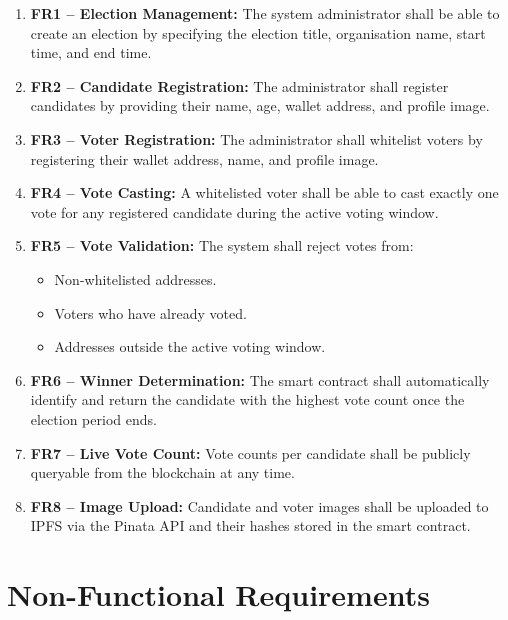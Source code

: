 \documentclass[12pt,a4paper]{report}
\begin{document}
\begin{enumerate}

\item \textbf{FR1 -- Election Management:}
The system administrator shall be able to create an election by specifying
the election title, organisation name, start time, and end time.

\item \textbf{FR2 -- Candidate Registration:}
The administrator shall register candidates by providing their name, age,
wallet address, and profile image.

\item \textbf{FR3 -- Voter Registration:}
The administrator shall whitelist voters by registering their wallet address,
name, and profile image.

\item \textbf{FR4 -- Vote Casting:}
A whitelisted voter shall be able to cast exactly one vote for any registered candidate
during the active voting window.

\item \textbf{FR5 -- Vote Validation:}
The system shall reject votes from:
\begin{itemize}
  \item Non-whitelisted addresses.
  \item Voters who have already voted.
  \item Addresses outside the active voting window.
\end{itemize}

\item \textbf{FR6 -- Winner Determination:}
The smart contract shall automatically identify and return the candidate with the
highest vote count once the election period ends.

\item \textbf{FR7 -- Live Vote Count:}
Vote counts per candidate shall be publicly queryable from the blockchain at any time.

\item \textbf{FR8 -- Image Upload:}
Candidate and voter images shall be uploaded to IPFS via the Pinata API and
their hashes stored in the smart contract.

\end{enumerate}

\section{Non-Functional Requirements}
\end{document}
